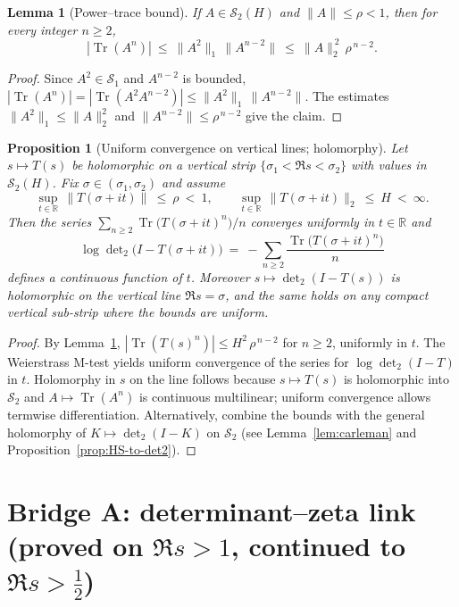 \documentclass[11pt]{article}
\newtheorem{proposition}[theorem]{Proposition}
\newtheorem{lemma}[theorem]{Lemma}
\theoremstyle{definition}
\theoremstyle{remark}
\newcommand{\R}{\mathbb{R}}
\newcommand{\HS}{\mathcal{S}_2}
\DeclareMathOperator{\Tr}{Tr}
\begin{document}
\begin{lemma}[Power--trace bound]\label{lem:power-trace}
If $A\in\mathcal S_2(H)$ and $\|A\|\le \rho<1$, then for every integer $n\ge 2$,
\[
  |\Tr(A^n)|\ \le\ \|A^2\|_1\,\|A^{n-2}\|\ \le\ \|A\|_2^{\,2}\,\rho^{\,n-2}.
\]
\end{lemma}

\begin{proof}
Since $A^2\in\mathcal S_1$ and $A^{n-2}$ is bounded, $|\Tr(A^n)|=|\Tr(A^2A^{n-2})|\le \|A^2\|_1\,\|A^{n-2}\|$. The estimates $\|A^2\|_1\le \|A\|_2^2$ and $\|A^{n-2}\|\le\rho^{\,n-2}$ give the claim.
\end{proof}

\begin{proposition}[Uniform convergence on vertical lines; holomorphy]\label{prop:det2-vertical}
Let $s\mapsto T(s)$ be holomorphic on a vertical strip $\{\sigma_1<\Re s<\sigma_2\}$ with values in $\mathcal S_2(H)$. Fix $\sigma\in(\sigma_1,\sigma_2)$ and assume
\[
  \sup_{t\in\R}\,\|T(\sigma+it)\|\ \le\ \rho\ <\ 1,\qquad
  \sup_{t\in\R}\,\|T(\sigma+it)\|_2\ \le\ H\ <\ \infty.
\]
Then the series $\sum_{n\ge 2}\Tr\big(T(\sigma+it)^n\big)/n$ converges uniformly in $t\in\R$ and
\[
  \log\det\nolimits_2\big(I-T(\sigma+it)\big)\ =\ -\sum_{n\ge 2}\frac{\Tr\big(T(\sigma+it)^n\big)}{n}
\]
defines a continuous function of $t$. Moreover $s\mapsto \det\nolimits_2(I-T(s))$ is holomorphic on the vertical line $\Re s=\sigma$, and the same holds on any compact vertical sub-strip where the bounds are uniform.
\end{proposition}

\begin{proof}
By Lemma~\ref{lem:power-trace}, $|\Tr(T(s)^n)|\le H^2\,\rho^{\,n-2}$ for $n\ge 2$, uniformly in $t$. The Weierstrass M-test yields uniform convergence of the series for $\log\det\nolimits_2(I-T)$ in $t$. Holomorphy in $s$ on the line follows because $s\mapsto T(s)$ is holomorphic into $\mathcal S_2$ and $A\mapsto \Tr(A^n)$ is continuous multilinear; uniform convergence allows termwise differentiation. Alternatively, combine the bounds with the general holomorphy of $K\mapsto\det\nolimits_2(I-K)$ on $\HS$ (see Lemma~\ref{lem:carleman} and Proposition~\ref{prop:HS-to-det2}).
\end{proof}

\section{Bridge A: determinant--zeta link (proved on $\Re s>1$, continued to $\Re s>\tfrac12$)}\label{sec:bridge-A}
\end{document}
